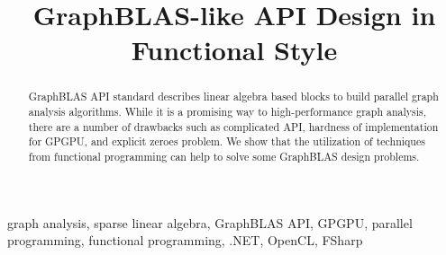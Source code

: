 \documentclass[conference]{IEEEtran}
\begin{document}
\makeatletter %
\newcommand{\linebreakand}{%
  \end{@IEEEauthorhalign}
  \hfill\mbox{}\par
  \mbox{}\hfill\begin{@IEEEauthorhalign}
}
\makeatother %


\title{GraphBLAS-like API Design in Functional Style\\
}

\author{
}


\maketitle

\begin{abstract}
    GraphBLAS API standard describes linear algebra based blocks to build parallel graph analysis algorithms.
    While it is a promising way to high-performance graph analysis, there are a number of drawbacks such as complicated API, hardness of implementation for GPGPU, and explicit zeroes problem.
    We show that the utilization of techniques from functional programming can help to solve some GraphBLAS design problems.
\end{abstract}

\begin{IEEEkeywords}
graph analysis, sparse linear algebra, GraphBLAS API, GPGPU, parallel programming, functional programming, .NET, OpenCL, FSharp
\end{IEEEkeywords}



%

%



%




\end{document}
